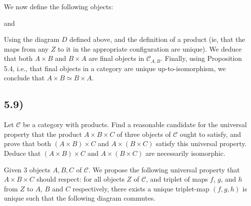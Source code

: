 \documentclass[12pt, letterpaper, twoside]{report}
\begin{document}
We now define the following objects:


and


Using the diagram $D$ defined above, and the definition of a product (ie, that the maps from any $Z$ to it in the appropriate configuration are unique). We deduce that both $A \times B$ and $B \times A$ are final objects in $\mathcal{C}_{A,B}$. Finally, using Proposition 5.4, i.e., that final objects in a category are unique up-to-isomorphism, we conclude that $A \times B \simeq B \times A$.



\subsection*{5.9)}

Let $\mathcal{C}$ be a category with products. Find a reasonable candidate for the universal property that the product $A \times B \times C$ of three objects of $\mathcal{C}$ ought to satisfy, and prove that both $(A \times B) \times C$ and $A \times (B \times C)$ satisfy this universal property. Deduce that $(A \times B) \times C$ and $A \times (B \times C)$ are necessarily isomorphic.

Given 3 objects $A, B, C$ of $\mathcal{C}$. We propose the following universal property that $A \times B \times C$ should respect: for all objects $Z$ of $\mathcal{C}$, and triplet of maps $f$, $g$, and $h$ from $Z$ to $A$, $B$ and $C$ respectively, there exists a unique triplet-map $(f,g,h)$ is unique such that the following diagram commutes.
\end{document}
